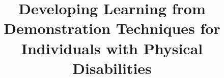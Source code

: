 \documentclass{acm_proc_article-sp}
\begin{document}

\title{Developing Learning from Demonstration Techniques for Individuals with Physical Disabilities}



\maketitle
\end{document}
